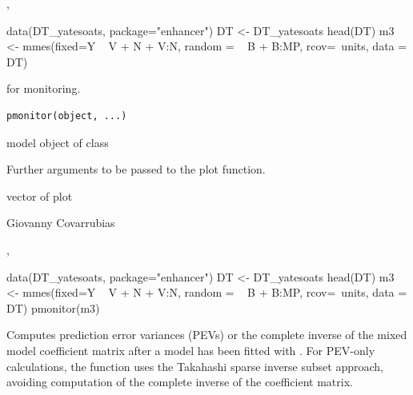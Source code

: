 \documentclass[a4paper]{book}
\begin{document}
%
\begin{SeeAlso}\relax
{}, 
\end{SeeAlso}
%
\begin{Examples}
\begin{ExampleCode}
data(DT_yatesoats, package="enhancer")
DT <- DT_yatesoats
head(DT)
m3 <- mmes(fixed=Y ~ V + N + V:N,
           random = ~ B + B:MP,
           rcov=~units,
           data = DT)

\end{ExampleCode}
\end{Examples}
%
\begin{Description}\relax
{} for monitoring.
\end{Description}
%
\begin{Usage}
\begin{verbatim}
pmonitor(object, ...)
\end{verbatim}
\end{Usage}
%
\begin{Arguments}
\begin{ldescription}
\item[\code{object}] model object of class 
\item[\code{...}] Further arguments to be passed to the plot function.
\end{ldescription}
\end{Arguments}
%
\begin{Value}
vector of plot

\end{Value}
%
\begin{Author}\relax
Giovanny Covarrubias
\end{Author}
%
\begin{SeeAlso}\relax
{}, 
\end{SeeAlso}
%
\begin{Examples}
\begin{ExampleCode}
data(DT_yatesoats, package="enhancer")
DT <- DT_yatesoats
head(DT)
m3 <- mmes(fixed=Y ~ V + N + V:N,
           random = ~ B + B:MP,
           rcov=~units,
           data = DT)
pmonitor(m3)
\end{ExampleCode}
\end{Examples}
%
\begin{Description}\relax
Computes prediction error variances (PEVs) or the complete inverse of the mixed model coefficient matrix after a model has been fitted with . For PEV-only calculations, the function uses the Takahashi sparse inverse subset approach, avoiding computation of the complete inverse of the coefficient matrix.
\end{Description}
\end{document}
